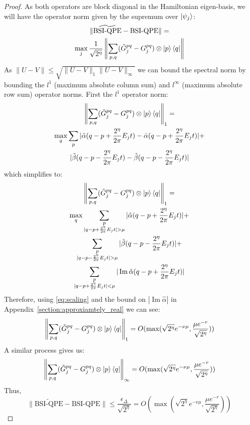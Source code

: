 \documentclass[aps,floatfix,10pt,amssymb,amsfont,amsmath,superscriptaddress,float,nofootinbib,longbibliography,nobalancelastpage,twocolumn]{revtex4-2}
\begin{document}
\begin{proof}
    As both operators are block diagonal in the Hamiltonian eigen-basis, we will have the operator norm given by the supremum over $\ket{\psi_j}$:
    \begin{multline}
        \|\widetilde{\text{BSI-QPE}}-\text{BSI-QPE}\| =\\ \max_j\frac{1}{\sqrt{2^{\eta}}} 
        \left\|\sum_{p,q}(\tilde G^{pq}_j - G^{pq}_j) \otimes \ket{p}\bra{q}\right\|
    \end{multline}
    As $\|U-V\| \leq \sqrt{\|U-V\|_{1}\|U-V\|_{\infty}}$ we can bound the spectral norm by bounding the $l^1$ (maximum absolute column sum) and $l^{\infty}$ (maximum absolute row sum) operator norms. First the $l^1$ operator norm:
    \begin{multline}
         \left\|\sum_{p,q}(\tilde G^{pq}_j - G^{pq}_j) \otimes \ket{p}\bra{q}\right\|_1 =\\ \max_q\sum_{p}|\tilde\alpha(q-p+\frac{2^{\eta}}{2\pi}E_jt)-\hat\alpha(q-p+\frac{2^{\eta}}{2\pi}E_jt)|+\\|\tilde\beta (q-p-\frac{2^{\eta}}{2\pi}E_jt)-\hat\beta (q-p-\frac{2^{\eta}}{2\pi}E_jt)|
    \end{multline}
    which simplifies to:
    \begin{multline}
         \left\|\sum_{p,q}(\tilde G^{pq}_j - G^{pq}_j) \otimes \ket{p}\bra{q}\right\|_1 =\\ \max_q\sum_{\substack{p\\|q-p+\frac{2^{\eta}}{2\pi}E_jt|>\mu}}|\hat\alpha(q-p+\frac{2^{\eta}}{2\pi}E_jt)|+\\\sum_{\substack{p\\|q-p-\frac{2^{\eta}}{2\pi}E_jt|>\mu}}|\hat\beta (q-p-\frac{2^{\eta}}{2\pi}E_jt)| + \\
         \sum_{\substack{p\\|q-p+\frac{2^{\eta}}{2\pi}E_jt|<\mu}}|\operatorname{Im}\hat\alpha(q-p+\frac{2^{\eta}}{2\pi}E_jt)|
    \end{multline}
    Therefore, using \eqref{eq:scaling} and the bound on $|\operatorname{Im}\hat \alpha|$ in Appendix~\ref{section:approxiamtely_real} we can see:
    \begin{equation}
        \left\|\sum_{p,q}(\tilde G^{pq}_j - G^{pq}_j) \otimes \ket{p}\bra{q}\right\|_1 = O(\max(\sqrt{2^{\eta}}e^{-\nu \mu},\frac{\mu e^{-r}}{\sqrt{2^{\eta}}}))
    \end{equation}
    A similar process gives us:
    \begin{equation}
        \left\|\sum_{p,q}(\tilde G^{pq}_j - G^{pq}_j) \otimes \ket{p}\bra{q}\right\|_{\infty} =O(\max(\sqrt{2^{\eta}}e^{-\nu \mu},\frac{\mu e^{-r}}{\sqrt{2^{\eta}}}))
    \end{equation}
    Thus,
    \begin{equation}
        \|\widetilde{\text{BSI-QPE}}-\text{BSI-QPE}\| \leq \frac{\epsilon_{\Delta}}{\sqrt{2^{\eta}}} = O(\max(\sqrt{2^{\eta}}e^{-\nu \mu},\frac{\mu e^{-r}}{\sqrt{2^{\eta}}}))
    \end{equation}
\end{proof}
\end{document}
